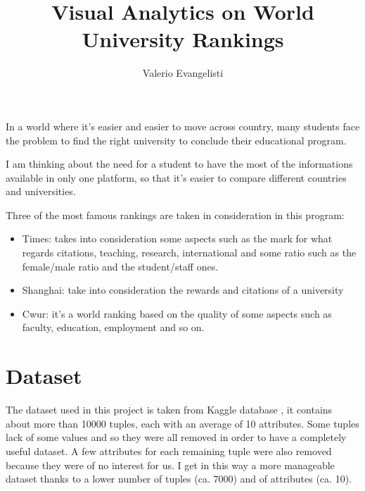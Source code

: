 \documentclass[journal]{vgtc}                %
\title{Visual Analytics on World University Rankings }
\author{Valerio Evangelisti}
\begin{document}


\maketitle


In a world where it's easier and easier to move across country, many students face the 
problem to find the right university to conclude their educational program.

I am thinking about the need for a student to have the most of the informations available in 
only one platform, so that it's easier to compare different countries and universities.

Three of the most famous rankings are taken in consideration in this program:
\begin{itemize}
\item Times: takes into consideration some aspects such as the mark for what regards citations, teaching, research, international and some ratio such as the female/male ratio and the student/staff ones.
\item Shanghai: take into consideration the rewards and citations of a university
\item Cwur: it's a world ranking based on the quality of some aspects such as faculty, education, employment and so on.
\end{itemize}


\section{Dataset}
The dataset used in this project is taken from Kaggle database , it contains about more than 10000 tuples, each with an average of 10 attributes.
Some tuples lack of some values and so they were all removed in order to have a completely useful dataset. A few attributes for each remaining tuple were also removed because they were of no interest for us. I get in this way a more manageable dataset thanks to a lower number of tuples (ca. 7000) and of attributes (ca. 10).
\end{document}
